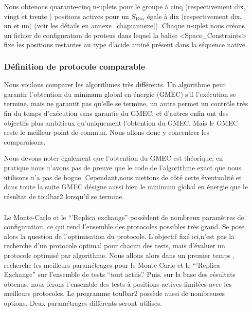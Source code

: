 Nous obtenons quarante-cinq n-uplets pour le groupe à cinq (respectivement dix, vingt et trente ) positions actives pour un $S_{Vois}$ égale à dix (respectivement dix, un et un) (voir les détails en annexe~\ref{chap:annexe}). Chaque n-uplet nous créons un fichier de configuration de proteus dans lequel la balise <Space\_Constraints> fixe les positions restantes au type d'acide aminé présent dans la séquence native. 


\subsubsection{Définition de protocole comparable}
\label{sec:proto_compa}
Nous voulons comparer les algorithmes très différents. Un algorithme peut garantir l'obtention du minimum global en énergie (GMEC) s'il l'exécution se termine, mais ne garantit pas qu'elle se termine, un autre permet un contrôle très fin du temps d'exécution sans garantie du GMEC, et d'autres enfin ont des objectifs plus ambitieux  qu'uniquement l'obtention du GMEC.
Mais le GMEC reste le meilleur point de commun. Nous allons donc y concentrer les comparaisons.

Nous devons noter également que l'obtention du GMEC est théorique, en pratique nous n'avons pas de preuve que le code de l'algorithme exact que nous utilisons n'a pas de bogue. Cependant,nous mettons de côté cette éventualité et dans toute la suite GMEC désigne aussi bien le minimum global en énergie que le résultat de toulbar2 lorsqu'il se termine.  
\subparagraph{}
Le Monte-Carlo et le ``'Replica exchange'' possèdent de nombreux paramètres de configuration, ce qui rend l'ensemble des protocoles possibles très grand. Se pose alors la question de l'optimisation du protocole. L'objectif fixé ici,n'est pas la recherche d'un protocole optimal pour chacun des tests, mais d'évaluer un protocole optimisé par algorithme.
Nous allons alors dans un premier temps , recherche les meilleurs paramétrages pour le Monte-Carlo et le ``'Replica Exchange'' sur l'ensemble de tests ``tout actifs'.'
Puis, sur la base des résultats obtenus, nous ferons l'ensemble des tests à positions actives limitées avec les meilleurs protocoles.
Le programme toulbar2 possède aussi de nombreuses options. Deux paramétrages différents seront utilisés.


